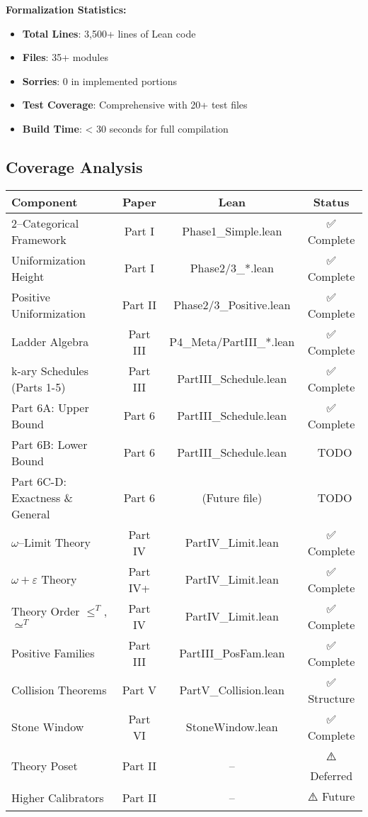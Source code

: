 \documentclass[11pt]{article}
\theoremstyle{definition}
\theoremstyle{remark}
\begin{document}
\begin{mdframed}[style=technical]
\textbf{Formalization Statistics:}
\begin{itemize}
\item \textbf{Total Lines}: 3,500+ lines of Lean code
\item \textbf{Files}: 35+ modules
\item \textbf{Sorries}: 0 in implemented portions
\item \textbf{Test Coverage}: Comprehensive with 20+ test files
\item \textbf{Build Time}: < 30 seconds for full compilation
\end{itemize}
\end{mdframed}

\subsection{Coverage Analysis}

\begin{center}
\begin{tabular}{|l|c|c|c|}
\hline
\textbf{Component} & \textbf{Paper} & \textbf{Lean} & \textbf{Status} \\
\hline
2--Categorical Framework & Part I & Phase1\_Simple.lean & ✅ Complete \\
Uniformization Height & Part I & Phase2/3\_*.lean & ✅ Complete \\
Positive Uniformization & Part II & Phase2/3\_Positive.lean & ✅ Complete \\
Ladder Algebra & Part III & P4\_Meta/PartIII\_*.lean & ✅ Complete \\
k-ary Schedules (Parts 1-5) & Part III & PartIII\_Schedule.lean & ✅ Complete \\
Part 6A: Upper Bound & Part 6 & PartIII\_Schedule.lean & ✅ Complete \\
Part 6B: Lower Bound & Part 6 & PartIII\_Schedule.lean & 🚧 TODO \\
Part 6C-D: Exactness \& General & Part 6 & (Future file) & 🚧 TODO \\
$\omega$--Limit Theory & Part IV & PartIV\_Limit.lean & ✅ Complete \\
$\omega+\varepsilon$ Theory & Part IV+ & PartIV\_Limit.lean & ✅ Complete \\
Theory Order $\leq^T$, $\simeq^T$ & Part IV & PartIV\_Limit.lean & ✅ Complete \\
Positive Families & Part III & PartIII\_PosFam.lean & ✅ Complete \\
Collision Theorems & Part V & PartV\_Collision.lean & ✅ Structure \\
Stone Window & Part VI & StoneWindow.lean & ✅ Complete \\
Theory Poset & Part II & -- & ⚠️ Deferred \\
Higher Calibrators & Part II & -- & ⚠️ Future \\
\hline
\end{tabular}
\end{center}
\end{document}
